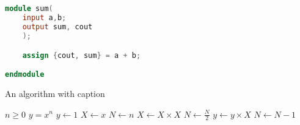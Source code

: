\appendix
\begin{appendices}
\renewcommand{\thechapter}{\Roman{chapter}}
\chapter{}\label{a1}
\begin{lstlisting}[language=Verilog, caption=Op-Amp Verilog-A module code,label={label:1}] 
module sum(
	input a,b;
	output sum, cout
	);

	assign {cout, sum} = a + b;

endmodule
\end{lstlisting}


\begin{algorithm}
\caption{An algorithm with caption}\label{alg:cap}
\begin{algorithmic}
\Require $n \geq 0$
\Ensure $y = x^n$
\State $y \gets 1$
\State $X \gets x$
\State $N \gets n$
    \State $X \gets X \times X$
    \State $N \gets \frac{N}{2}$  
    \State $y \gets y \times X$
    \State $N \gets N - 1$
\EndIf
\EndWhile
\end{algorithmic}
\end{algorithm}

\end{appendices}
